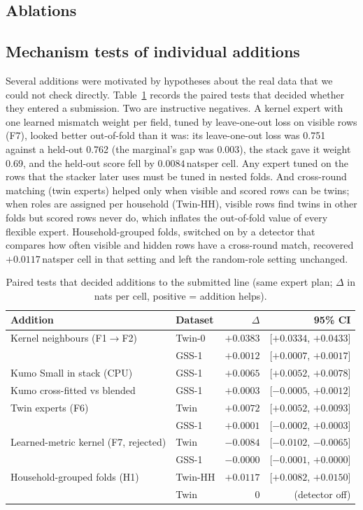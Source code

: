 \documentclass[10pt]{article}
\newcommand{\nats}{\,nats}
\begin{document}


\subsection{Ablations}
\label{sec:ablation}



\subsection{Mechanism tests of individual additions}
\label{sec:mechanism}
Several additions were motivated by hypotheses about the real data that we could not check directly. Table~\ref{tab:mech} records the paired tests that decided whether they entered a submission. Two are instructive negatives. A kernel expert with one learned mismatch weight per field, tuned by leave-one-out loss on visible rows (F7), looked better out-of-fold than it was: its leave-one-out loss was 0.751 against a held-out 0.762 (the marginal's gap was 0.003), the stack gave it weight 0.69, and the held-out score fell by $0.0084$\nats per cell. Any expert tuned on the rows that the stacker later uses must be tuned in nested folds. And cross-round matching (twin experts) helped only when visible and scored rows can be twins; when roles are assigned per household (Twin-HH), visible rows find twins in other folds but scored rows never do, which inflates the out-of-fold value of every flexible expert. Household-grouped folds, switched on by a detector that compares how often visible and hidden rows have a cross-round match, recovered $+0.0117$\nats per cell in that setting and left the random-role setting unchanged.

\begin{table}[t]
\centering\small
\caption{Paired tests that decided additions to the submitted line (same expert plan; $\Delta$ in nats per cell, positive = addition helps).}
\label{tab:mech}
\begin{tabular}{llrr}
\toprule
Addition & Dataset & $\Delta$ & 95\% CI \\
\midrule
Kernel neighbours (F1$\to$F2) & Twin-0 & $+0.0383$ & [$+0.0334$, $+0.0433$] \\
 & GSS-1 & $+0.0012$ & [$+0.0007$, $+0.0017$] \\
Kumo Small in stack (CPU) & GSS-1 & $+0.0065$ & [$+0.0052$, $+0.0078$] \\
Kumo cross-fitted vs blended & GSS-1 & $+0.0003$ & [$-0.0005$, $+0.0012$] \\
Twin experts (F6) & Twin & $+0.0072$ & [$+0.0052$, $+0.0093$] \\
 & GSS-1 & $+0.0001$ & [$-0.0002$, $+0.0003$] \\
Learned-metric kernel (F7, rejected) & Twin & $-0.0084$ & [$-0.0102$, $-0.0065$] \\
 & GSS-1 & $-0.0000$ & [$-0.0001$, $+0.0000$] \\
Household-grouped folds (H1) & Twin-HH & $+0.0117$ & [$+0.0082$, $+0.0150$] \\
 & Twin & $0$ & (detector off) \\
\bottomrule
\end{tabular}
\end{table}
\end{document}
